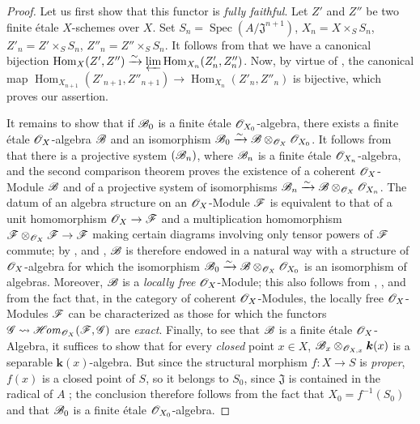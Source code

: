 \begin{proof}
Let us first show that this functor is \emph{fully faithful}.
Let $Z'$ and $Z''$ be two finite \'etale $X$-schemes over $X$.
Set $S_n=\operatorname{Spec}(A/\mathfrak{J}^{n+1})$, $X_n=X\times_S S_n$, $Z'_n=Z'\times_S S_n$, $Z''_n=Z''\times_S S_n$.
It follows from  that we have a canonical bijection $\operatorname{Hom}_X(Z',Z'')\xrightarrow{\sim}\varprojlim\operatorname{Hom}_{X_n}(Z'_n,Z''_n)$.
Now, by virtue of , the canonical map $\operatorname{Hom}_{X_{n+1}}(Z'_{n+1},Z''_{n+1})\to\operatorname{Hom}_{X_n}(Z'_n,Z''_n)$ is bijective, which proves our assertion.

It remains to show that if $\mathscr{B}_0$ is a finite \'etale $\mathscr{O}_{X_0}$-algebra, there exists a finite \'etale $\mathscr{O}_X$-algebra $\mathscr{B}$ and an isomorphism $\mathscr{B}_0\xrightarrow{\sim}\mathscr{B}\otimes_{\mathscr{O}_X}\mathscr{O}_{X_0}$.
It follows from  that there is a projective system $(\mathscr{B}_n)$, where $\mathscr{B}_n$ is a finite \'etale $\mathscr{O}_{X_n}$-algebra, and the second comparison theorem  proves the existence of a coherent $\mathscr{O}_X$-Module $\mathscr{B}$ and of a projective system of isomorphisms $\mathscr{B}_n\xrightarrow{\sim}\mathscr{B}\otimes_{\mathscr{O}_X}\mathscr{O}_{X_n}$.
The datum of an algebra structure on an $\mathscr{O}_X$-Module $\mathscr{F}$ is equivalent to that of a unit homomorphism $\mathscr{O}_X\to\mathscr{F}$ and a multiplication homomorphism $\mathscr{F}\otimes_{\mathscr{O}_X}\mathscr{F}\to\mathscr{F}$ making certain diagrams involving only tensor powers of $\mathscr{F}$ commute;
by ,  and , $\mathscr{B}$ is therefore endowed in a natural way with a structure of $\mathscr{O}_X$-algebra for which the isomorphism $\mathscr{B}_0\xrightarrow{\sim}\mathscr{B}\otimes_{\mathscr{O}_X}\mathscr{O}_{X_0}$ is an isomorphism of algebras.
Moreover, $\mathscr{B}$ is a \emph{locally free} $\mathscr{O}_X$-Module;
this also follows from , ,  and from the fact that, in the category of coherent $\mathscr{O}_X$-Modules, the locally free $\mathscr{O}_X$-Modules $\mathscr{F}$ can be characterized as those for which the functors $\mathscr{G}\leadsto\mathscr{H}\!\mathit{om}_{\mathscr{O}_X}(\mathscr{F},\mathscr{G})$ are \emph{exact}.
Finally, to see that $\mathscr{B}$ is a finite \'etale $\mathscr{O}_X$-Algebra, it suffices  to show that for every \emph{closed} point $x\in X$, $\mathscr{B}_x\otimes_{\mathscr{O}_{X,x}}\boldsymbol{k}(x)$ is a separable $\boldsymbol{k}(x)$-algebra.
But since the structural morphism $f:X\to S$ is \emph{proper}, $f(x)$ is a closed point of $S$, so it belongs to $S_0$, since $\mathfrak{J}$ is contained in the radical of $A$ ;
the conclusion therefore follows from the fact that $X_0=f^{-1}(S_0)$ and that $\mathscr{B}_0$ is a finite \'etale $\mathscr{O}_{X_0}$-algebra.
\end{proof}


